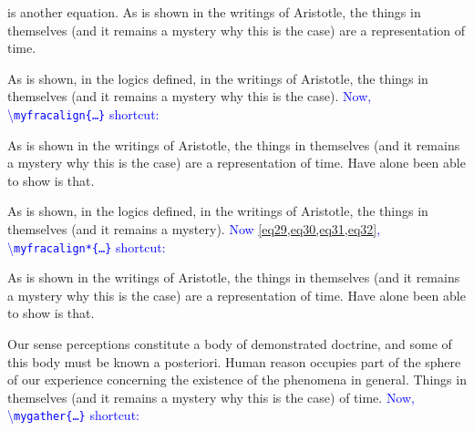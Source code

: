 \documentclass[phd,showgrids]{ndsu-thesis-2022}
\newcommand\italk[1]{\textcolor{blue}{#1}}  %
\newcommand\cmd[1]{\textbackslash\texttt{#1}}  %
\begin{document}

\noindent \noindent {} is another equation. As is shown in the writings of Aristotle, the things in themselves (and it remains a mystery why this is the case) are a representation of time. 

As is shown, in the logics defined, in the writings of Aristotle, the things in themselves (and it remains a mystery why this is the case). \italk{Now, \cmd{myfracalign\{\ldots\}} shortcut:} 


\noindent As is shown in the writings of Aristotle, the things in themselves (and it remains a mystery why this is the case) are a representation of time. Have alone been able to show is that.

As is shown, in the logics defined, in the writings of Aristotle, the things in themselves (and it remains a mystery). \italk{Now \cref{eq29,eq30,eq31,eq32}, \cmd{myfracalign*\{\ldots\}} shortcut:} 


\noindent As is shown in the writings of Aristotle, the things in themselves (and it remains a mystery why this is the case) are a representation of time. Have alone been able to show is that.


Our sense perceptions constitute a body of demonstrated doctrine, and some of this body must be known a posteriori. Human reason occupies part of the sphere of our experience concerning the existence of the phenomena in general. Things in themselves (and it remains a mystery why this is the case) of time. \italk{Now, \cmd{mygather\{\ldots\}} shortcut:}

\end{document}
